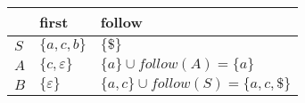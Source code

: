 \documentclass{standalone}
\providecommand\lightrule{%
	\arrayrulecolor{black!30}%
	\midrule[\lightrulewidth]%
	\arrayrulecolor{black}}
\begin{document}
\begin{tabularx}{\textwidth}{XXX}
        & first & follow \\
        \midrule
            \(S\)
            &
            \(\{a, c, b\}\)
            &
            \(\{\$\}\)
            \\ \lightrule
            \(A\)
            &
            \(\{c, \varepsilon\}\)
            &
            \(\{a\} \cup follow(A) = \{a\}\)
            \\ \lightrule
            \(B\)
            &
            \(\{\varepsilon\}\)
            &
            \(\{a, c\} \cup follow(S) = \{a, c, \$\}\)
    \end{tabularx}
\end{document}
